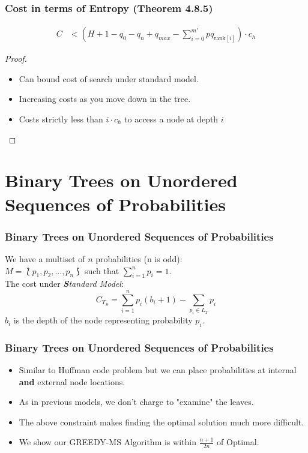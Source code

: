 \documentclass{beamer}
\theoremstyle{plain}
\begin{document}
\begin{frame}\frametitle{Cost in terms of Entropy (Theorem 4.8.5)}
\begin{align*}
C &<  \left(H + 1 - q_0 - q_n + q_{max} - \sum_{i=0}^{m'} pq_{\text{rank}[i]} \right)\cdot c_h
\end{align*}
\begin{proof}
\begin{itemize}
\item Can bound cost of search under standard model.
\item Increasing costs as you move down in the tree.
\item Costs strictly less than $i \cdot c_h$ to access a node at depth $i$
\end{itemize}
\end{proof}
\end{frame}


\section{Binary Trees on Unordered Sequences of Probabilities}\label{BST over Multisets}

\begin{frame} \frametitle{Binary Trees on Unordered Sequences of Probabilities}
We have a multiset of $n$ probabilities (n is odd): \\
$M = \lbag p_1, p_2, ..., p_n \rbag$ such that $\sum\limits_{i=1}^n p_i = 1$.  \\
The cost under \textit{\textbf{S}tandard Model}:
\begin{equation}
C_{T_S} = \sum_{i=1}^{n} p_i(b_i+1) - \sum_{p_i \in L_T} p_i
\end{equation}
$b_i$ is the depth of the node representing probability $p_i$.
\end{frame}

\begin{frame} \frametitle{Binary Trees on Unordered Sequences of Probabilities}
\begin{itemize}
\item Similar to Huffman code problem but we can place probabilities at internal \textbf{and} external node locations.
\item As in previous models, we don't charge to "examine" the leaves.
\item The above constraint makes finding the optimal solution much more difficult.
\item We show our GREEDY-MS Algorithm is within $\frac{n+1}{2n}$ of Optimal.
\end{itemize}
\end{frame}
\end{document}
